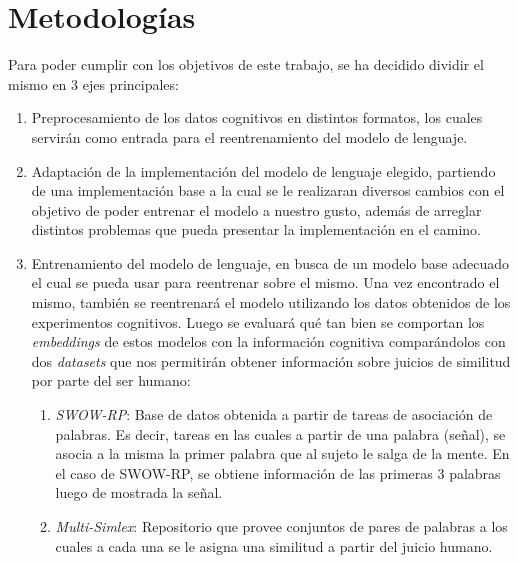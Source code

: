 \chapter{Metodologías}

Para poder cumplir con los objetivos de este trabajo, se ha decidido dividir el mismo en 3 ejes principales:

\begin{enumerate}
    \item Preprocesamiento de los datos cognitivos en distintos formatos, los cuales servirán como entrada para el reentrenamiento del modelo de lenguaje.
    \item Adaptación de la implementación del modelo de lenguaje elegido, partiendo de una implementación base a la cual se le realizaran diversos cambios con el objetivo de poder entrenar el modelo a nuestro gusto, además de arreglar distintos problemas que pueda presentar la implementación en el camino.
    \item Entrenamiento del modelo de lenguaje, en busca de un modelo base adecuado el cual se pueda usar para reentrenar sobre el mismo. Una vez encontrado el mismo, también se reentrenará el modelo utilizando los datos obtenidos de los experimentos cognitivos. Luego se evaluará qué tan bien se comportan los \textit{embeddings} de estos modelos con la información cognitiva comparándolos con dos \textit{datasets} que nos permitirán obtener información sobre juicios de similitud por parte del ser humano:
    \begin{enumerate}
        \item \textit{SWOW-RP}: Base de datos obtenida a partir de tareas de asociación de palabras. Es decir, tareas en las cuales a partir de una palabra (señal), se asocia a la misma la primer palabra que al sujeto le salga de la mente. En el caso de SWOW-RP, se obtiene información de las primeras 3 palabras luego de mostrada la señal. \parencite{Cabana2023}
        \item \textit{Multi-Simlex}: Repositorio que provee conjuntos de pares de palabras a los cuales a cada una se le asigna una similitud a partir del juicio humano. \parencite{Vulic2020}
    \end{enumerate}
\end{enumerate}